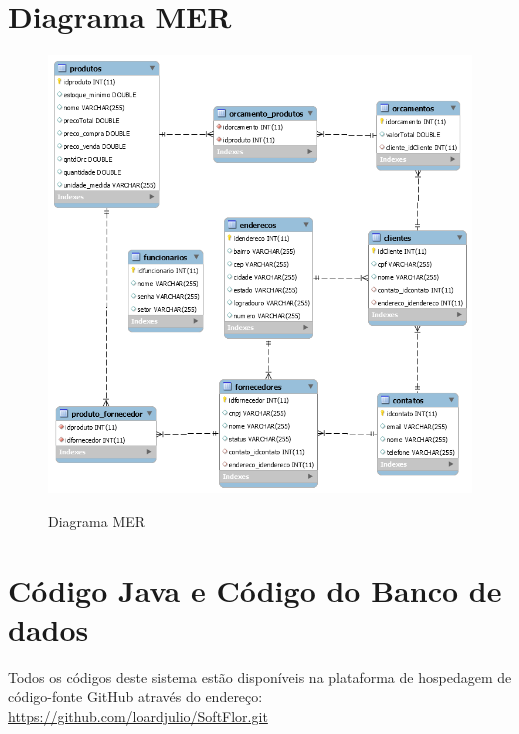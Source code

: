 \begin{anexosenv}
\chapter{Diagrama MER}
\begin{figure}[h]
\centering
\caption{Diagrama MER}
\includegraphics[width=16cm]{imagens/diagramas/bd2}
\label{fig:Diagrama MER}
\end{figure}

\chapter{Código Java e Código do Banco de dados}
	Todos os códigos deste sistema estão disponíveis na plataforma de hospedagem de código-fonte GitHub através do endereço: \url{https://github.com/loardjulio/SoftFlor.git}
	
\end{anexosenv}